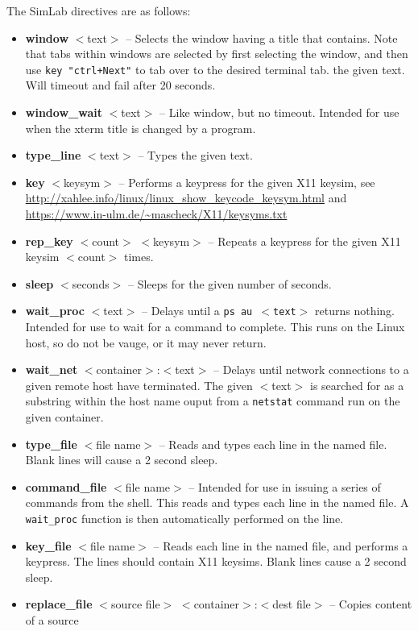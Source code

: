 \documentclass[12pt]{article}
\begin{document}
The SimLab directives are as follows:
\begin{itemize}
\item \textbf{window} $<$text$>$ -- Selects the window having a title that contains.  Note that
tabs within windows are selected by first selecting the window, and then use {\tt key "ctrl+Next"}
to tab over to the desired terminal tab.
the given text.  Will timeout and fail after 20 seconds.
\item \textbf{window\_wait} $<$text$>$ -- Like window, but no timeout.  Intended for
use when the xterm title is changed by a program.
\item \textbf{type\_line} $<$text$>$ -- Types the given text.
\item \textbf{key} $<$keysym$>$ -- Performs a keypress for the given X11 keysim, see
\url{http://xahlee.info/linux/linux\_show\_keycode\_keysym.html} and 
\url{https://www.in-ulm.de/~mascheck/X11/keysyms.txt}
\item \textbf{rep\_key} $<$count$>$ $<$keysym$>$ -- Repeats a keypress for the given X11 keysim $<$count$>$ times.
\item \textbf{sleep} $<$seconds$>$ -- Sleeps for the given number of seconds.
\item \textbf{wait\_proc} $<$text$>$ -- Delays until a {\tt ps au $<$text$>$} returns nothing.
Intended for use to wait for a command to complete.  This runs on the Linux host, so
do not be vauge, or it may never return.
\item \textbf{wait\_net} $<$container$>$:$<$text$>$ -- Delays until network connections to a given remote
host have terminated.  The given $<$text$>$ is searched for as a substring within the host name ouput
from a {\tt netstat} command run on the given container.
\item \textbf{type\_file} $<$file name$>$ -- Reads and types each line in the named file.
Blank lines will cause a 2 second sleep.
\item \textbf{command\_file} $<$file name$>$ -- Intended for use in issuing a series of
commands from the shell.  This reads and types each line in the named file.
A {\tt wait\_proc} function is then automatically performed on the line.
\item \textbf{key\_file} $<$file name$>$ -- Reads each line in the named file, and performs
a keypress.  The lines should contain X11 keysims.  Blank lines cause a 2 second sleep.
\item \textbf{replace\_file} $<$source file$>$ $<$container$>$:$<$dest file$>$ -- Copies content of a source

\end{itemize}
\end{document}
